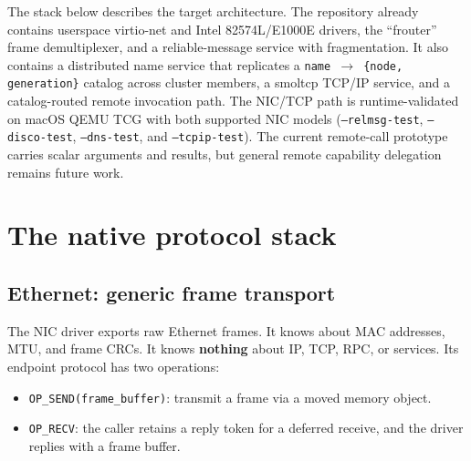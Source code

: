 The stack below describes the target architecture. The repository already
contains userspace virtio-net and Intel 82574L/E1000E drivers, the ``frouter''
frame demultiplexer, and a reliable-message service with fragmentation. It also
contains a distributed name service that replicates a
\texttt{name $\rightarrow$ \{node, generation\}} catalog across cluster
members, a smoltcp TCP/IP service, and a catalog-routed remote invocation path.
The NIC/TCP path is runtime-validated on macOS QEMU TCG with both supported NIC
models (\texttt{--relmsg-test}, \texttt{--disco-test},
\texttt{--dns-test}, and \texttt{--tcpip-test}). The current remote-call
prototype carries scalar arguments and results, but general remote capability
delegation remains future work.

\section{The native protocol stack}

\begin{center}
\end{center}

\subsection{Ethernet: generic frame transport}

The NIC driver exports raw Ethernet frames. It knows about MAC addresses, MTU,
and frame CRCs. It knows \textbf{nothing} about IP, TCP, RPC, or services. Its
endpoint protocol has two operations:

\begin{itemize}
    \item \texttt{OP\_SEND(frame\_buffer)}: transmit a frame via a moved
        memory object.
    \item \texttt{OP\_RECV}: the caller retains a reply token for a deferred
        receive, and the driver replies with a frame buffer.
\end{itemize}

